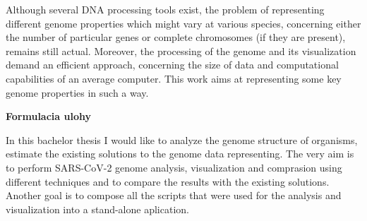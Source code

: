 Although several DNA processing tools exist, the problem of representing different genome properties which might vary at various species, 
concerning either the number of particular genes or complete chromosomes (if they are present), remains still actual. Moreover, 
the processing of the genome and its visualization demand an efficient approach, concerning the size of data and computational capabilities 
of an average computer. This work aims at representing some key genome properties in such a way.

\bigskip
\bigskip

{\noindent\LARGE{\textbf{Formulacia ulohy}}}

\smallskip
\smallskip

In this bachelor thesis I would like to analyze the genome structure of organisms, estimate the existing solutions to the genome data representing.
The very aim is to perform SARS-CoV-2 genome analysis, visualization and comprasion using different techniques and to compare the results with the existing solutions.
Another goal is to compose all the scripts that were used for the analysis and visualization into a stand-alone aplication.